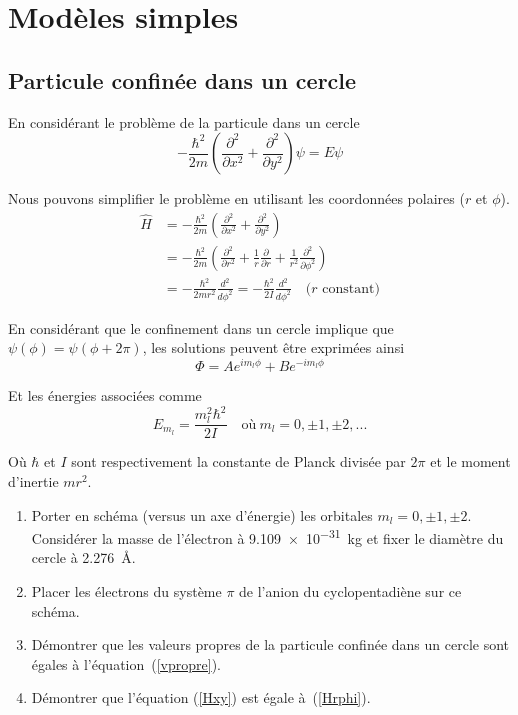 \documentclass[12pt,letterpaper]{article}
\begin{document}
\section*{Modèles simples}
\subsection*{Particule confinée dans un cercle}

En considérant le problème de la particule dans un cercle
\begin{equation}
-\frac{\hbar^2}{2m} \left( \frac{\partial^2}{\partial x^2} + \frac{\partial^2}{\partial y^2} \right) \psi = E \psi
\end{equation}

Nous pouvons simplifier le problème en utilisant les coordonnées polaires ($r$ et $\phi$).
\begin{align}
\label{Hxy} \hat{H} &= -\frac{\hbar^2}{2m} \left( \frac{\partial^2}{\partial x^2} + \frac{\partial^2}{\partial y^2} \right) \\
\label{Hrphi} &= -\frac{\hbar^2}{2m} \left( \frac{\partial^2}{\partial r^2} + \frac{1}{r} \frac{\partial}{\partial r} +  \frac{1}{r^2} \frac{\partial^2}{\partial \phi^2} \right) \\
&= -\frac{\hbar^2}{2mr^2} \frac{d^2}{d \phi^2} = -\frac{\hbar^2}{2I} \frac{d^2}{d \phi^2}\quad\text{(}r\text{ constant)}
\end{align}

En considérant que le confinement dans un cercle implique que $\psi(\phi) = \psi(\phi + 2\pi)$, les solutions peuvent être exprimées ainsi
\begin{equation}
\Phi = A e^{i m_l \phi} + B e^{-i m_l \phi}
\end{equation}

Et les énergies associées comme
\begin{equation}
E_{m_l} = \frac{m_l^2 \hbar^2}{2I}\quad\text{où}\ m_l=0,\pm 1,\pm 2, ...
\label{vpropre}
\end{equation}

Où $\hbar$ et $I$ sont respectivement la constante de Planck divisée par $2\pi$ et le moment d'inertie $m r^2$.
\begin{enumerate}
\item Porter en schéma (versus un axe d'énergie) les orbitales $m_l=0,\pm 1, \pm 2$. Considérer la masse de l'électron à \SI{9.109e-31}{\kilo\gram} et fixer le diamètre du cercle à \SI{2.276}{\angstrom}.
\item Placer les électrons du système $\pi$ de l'anion du cyclopentadiène sur ce schéma.
\item Démontrer que les valeurs propres de la particule confinée dans un cercle sont égales à l'équation~(\ref{vpropre}).
\item Démontrer que l'équation (\ref{Hxy}) est égale à~(\ref{Hrphi}).
\end{enumerate}
\end{document}
